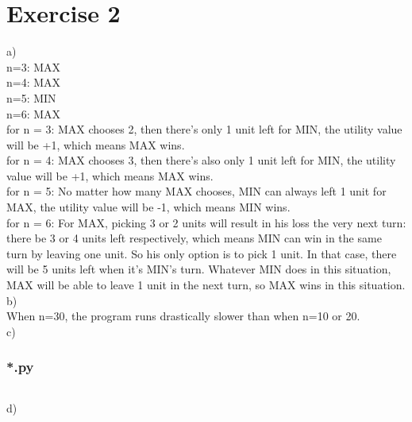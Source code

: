 \documentclass{article}
\begin{document}
\section*{Exercise 2}
a)
\\
n=3: MAX \\
n=4: MAX \\
n=5: MIN \\
n=6: MAX \\
for n = 3: MAX chooses 2, then there's only 1 unit left for MIN, the utility value will be +1, which means MAX wins. \\
for n = 4: MAX chooses 3, then there's also only 1 unit left for MIN,  the utility value will be +1, which means MAX wins. \\
for n = 5: No matter how many MAX chooses, MIN can always left 1 unit for MAX, the utility value will be -1, which means MIN wins. \\
for n = 6: For MAX, picking 3 or 2 units will result in his loss the very next turn: there be 3 or 4 units left respectively, which means MIN can win in the same turn by leaving one unit. So his only option is to pick 1 unit. In that case, there will be 5 units left when it's MIN's turn. Whatever MIN does in this situation, MAX will be able to leave 1 unit in the next turn, so MAX wins in this situation.
\\
b)
\\
When n=30, the program runs drastically slower than when n=10 or 20.
\\
c)
\\
\subsubsection*{*.py}
\begin{lstlisting}
\end{lstlisting}
d)
\\
\\
\end{document}
